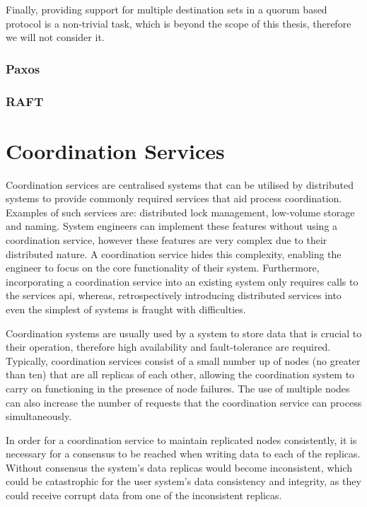 	Finally, providing support for multiple destination sets in a quorum based protocol is a non-trivial task, which is beyond the scope of this thesis, therefore we will not consider it.  
		\subsubsection{Paxos}
		\subsubsection{RAFT}		
	

\section{Coordination Services}
Coordination services are centralised systems that can be utilised by distributed systems to provide commonly required services that aid process coordination. Examples of such services are: distributed lock management, low-volume storage and naming. System engineers can implement these features without using a coordination service, however these features are very complex due to their distributed nature. A coordination service hides this complexity, enabling the engineer to focus on the core functionality of their system. Furthermore, incorporating a coordination service into an existing system only requires calls to the services api, whereas, retrospectively introducing distributed services into even the simplest of systems is fraught with difficulties. 

Coordination systems are usually used by a system to store data that is crucial to their operation, therefore high availability and fault-tolerance are required. Typically, coordination services consist of a small number up of nodes (no greater than ten) that are all replicas of each other, allowing the coordination system to carry on functioning in the presence of node failures. The use of multiple nodes can also increase the number of requests that the coordination service can process simultaneously. 

In order for a coordination service to maintain replicated nodes consistently, it is necessary for a consensus to be reached when writing data to each of the replicas. Without consensus the system's data replicas would become inconsistent, which could be catastrophic for the user system's data consistency and integrity, as they could receive corrupt data from one of the inconsistent replicas. 

